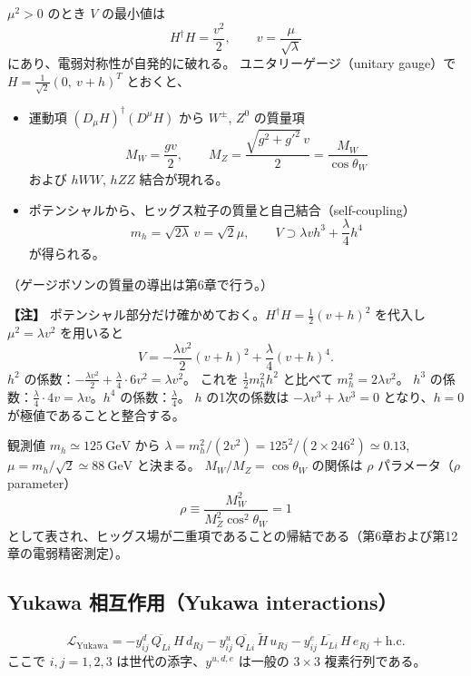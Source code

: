 \documentclass[uplatex,dvipdfmx,a4paper,11pt,openany]{jsbook}
\newcommand{\en}[1]{（#1）}
\newenvironment{note}{\vspace{1ex}\par\footnotesize\noindent\textbf{【注】}}{\par\vspace{1ex}}
\numberwithin{equation}{chapter}
\theoremstyle{definition}
\theoremstyle{plain}
\theoremstyle{remark}
\newcommand{\Lag}{\mathcal{L}}
\newcommand{\hc}{\mathrm{h.c.}}
\begin{document}
$\mu^2>0$ のとき $V$ の最小値は
\begin{equation}
H^\dagger H=\frac{v^2}{2},\qquad v=\frac{\mu}{\sqrt\lambda}
\end{equation}
にあり、電弱対称性が自発的に破れる。
ユニタリーゲージ\en{unitary gauge}で $H=\frac{1}{\sqrt2}(0,\ v+h)^T$ とおくと、
\begin{itemize}
    \item 運動項 $(D_\mu H)^\dagger(D^\mu H)$ から $W^\pm$, $Z^0$ の質量項
    \begin{equation}
    M_W=\frac{gv}{2},\qquad
    M_Z=\frac{\sqrt{g^2+g'^2}\,v}{2}=\frac{M_W}{\cos\theta_W}
    \end{equation}
    および $hWW$, $hZZ$ 結合が現れる。
    \item ポテンシャルから、ヒッグス粒子の質量と自己結合\en{self-coupling}
    \begin{equation}
    m_h=\sqrt{2\lambda}\,v=\sqrt2\mu,\qquad
    V\supset\lambda vh^3+\frac\lambda4h^4
    \end{equation}
    が得られる。
\end{itemize}
（ゲージボソンの質量の導出は第6章で行う。）
\begin{note}
ポテンシャル部分だけ確かめておく。$H^\dagger H=\frac12(v+h)^2$ を代入し $\mu^2=\lambda v^2$ を用いると
\[
V=-\frac{\lambda v^2}{2}(v+h)^2+\frac\lambda4(v+h)^4 .
\]
$h^2$ の係数：$-\frac{\lambda v^2}{2}+\frac\lambda4\cdot6v^2=\lambda v^2$。
これを $\frac12m_h^2h^2$ と比べて $m_h^2=2\lambda v^2$。
$h^3$ の係数：$\frac\lambda4\cdot4v=\lambda v$。$h^4$ の係数：$\frac\lambda4$。
$h$ の1次の係数は $-\lambda v^3+\lambda v^3=0$ となり、$h=0$ が極値であることと整合する。
\end{note}
観測値 $m_h\simeq125\ \mathrm{GeV}$ から
$\lambda=m_h^2/(2v^2)=125^2/(2\times246^2)\simeq0.13$,
$\mu=m_h/\sqrt2\simeq88\ \mathrm{GeV}$ と決まる。
$M_W/M_Z=\cos\theta_W$ の関係は $\rho$ パラメータ\en{$\rho$ parameter}
\begin{equation}
\rho\equiv\frac{M_W^2}{M_Z^2\cos^2\theta_W}=1
\end{equation}
として表され、ヒッグス場が二重項であることの帰結である（第6章および第12章の電弱精密測定）。
\subsection{Yukawa 相互作用（Yukawa interactions）}
\begin{equation}
\Lag_{\mathrm{Yukawa}}
=
-y^d_{ij}\,\overline{Q_{Li}}\,H\,d_{Rj}
-y^u_{ij}\,\overline{Q_{Li}}\,\tilde H\,u_{Rj}
-y^e_{ij}\,\overline{L_{Li}}\,H\,e_{Rj}
+\hc
\end{equation}
ここで $i,j=1,2,3$ は世代の添字、$y^{u,d,e}$ は一般の $3\times3$ 複素行列である。
\end{document}
